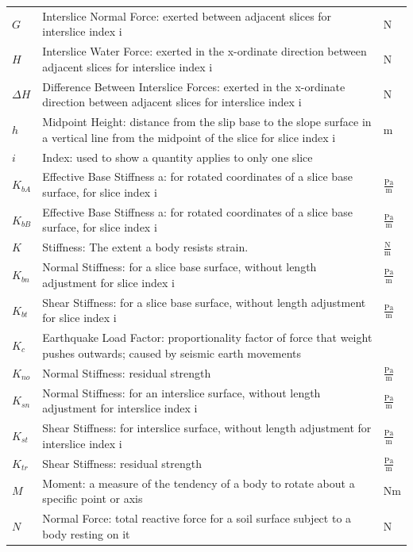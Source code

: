 \documentclass[12pt]{article}
\begin{document}
\begin{longtabu}{l X[l] l}
\\
$G$ & Interslice Normal Force: exerted between adjacent slices for interslice index i & N
\\
$H$ & Interslice Water Force: exerted in the x-ordinate direction between adjacent slices for interslice index i & N
\\
$ΔH$ & Difference Between Interslice Forces: exerted in the x-ordinate direction between adjacent slices for interslice index i & N
\\
$h$ & Midpoint Height: distance from the slip base to the slope surface in a vertical line from the midpoint of the slice for slice index i & m
\\
$i$ & Index: used to show a quantity applies to only one slice & 
\\
${K_{bA}}$ & Effective Base Stiffness a: for rotated coordinates of a slice base surface, for slice index i & $\frac{\text{Pa}}{\text{m}}$
\\
${K_{bB}}$ & Effective Base Stiffness a: for rotated coordinates of a slice base surface, for slice index i & $\frac{\text{Pa}}{\text{m}}$
\\
$K$ & Stiffness: The extent a body resists strain. & $\frac{\text{N}}{\text{m}}$
\\
${K_{bn}}$ & Normal Stiffness: for a slice base surface, without length adjustment for slice index i & $\frac{\text{Pa}}{\text{m}}$
\\
${K_{bt}}$ & Shear Stiffness: for a slice base surface, without length adjustment for slice index i & $\frac{\text{Pa}}{\text{m}}$
\\
${K_{c}}$ & Earthquake Load Factor: proportionality factor of force that weight pushes outwards; caused by seismic earth movements & 
\\
${K_{no}}$ & Normal Stiffness: residual strength & $\frac{\text{Pa}}{\text{m}}$
\\
${K_{sn}}$ & Normal Stiffness: for an interslice surface, without length adjustment for interslice index i & $\frac{\text{Pa}}{\text{m}}$
\\
${K_{st}}$ & Shear Stiffness: for interslice surface, without length adjustment for interslice index i & $\frac{\text{Pa}}{\text{m}}$
\\
${K_{tr}}$ & Shear Stiffness: residual strength & $\frac{\text{Pa}}{\text{m}}$
\\
$M$ & Moment: a measure of the tendency of a body to rotate about a specific point or axis & Nm
\\
$N$ & Normal Force: total reactive force for a soil surface subject to a body resting on it & N

\end{longtabu}
\end{document}

